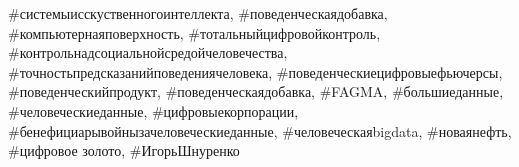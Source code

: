 \#системыисскуственногоинтеллекта, \#поведенческаядобавка,
\#компьютернаяповерхность, \#тотальныйцифровойконтроль,
\#контрольнадсоциальнойсредойчеловечества,
\#точностьпредсказанийповедениячеловека, \#поведенческиецифровыефьючерсы,
\#поведенческийпродукт, \#поведенческаядобавка, \#FAGMA, \#большиеданные,
\#человеческиеданные, \#цифровыекорпорации,
\#бенефициарывойнызачеловеческиеданные, \#человеческаяbigdata, \#новаянефть,
\#цифровое золото, \#ИгорьШнуренко
  
